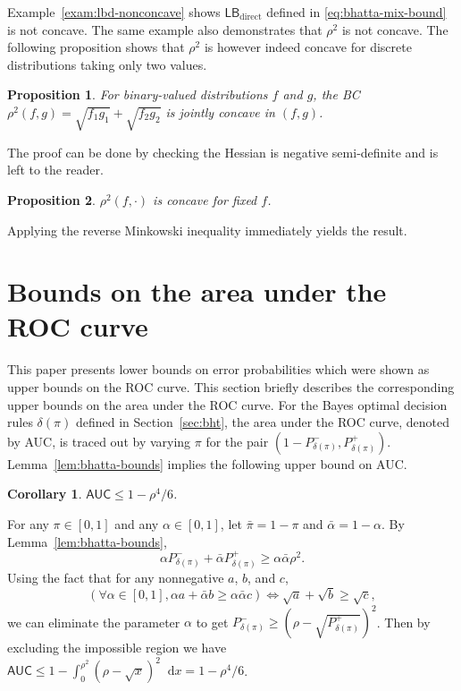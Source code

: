 \documentclass[conference,letterpaper]{IEEEtran}
\newtheorem{prop}{Proposition}
\newtheorem{cor}{Corollary}
\renewcommand{\d}{\mathop{}\!\mathrm{d}}%
\newcommand{\distA}{f}%
\newcommand{\distB}{g}%
\newcommand{\fnrHT}{P^-}%
\newcommand{\fprHT}{P^+}%
\newcommand{\LBDirect}{\mathsf{LB}_{\text{direct}}}%
\newcommand{\piComp}{\bar\pi}
\newcommand{\alphaComp}{\bar\alpha}
\begin{document}
{Example~\ref{exam:lbd-nonconcave} shows $\LBDirect$ defined in
\eqref{eq:bhatta-mix-bound} is not concave.  The same example also
demonstrates that $\rho^2$ is not concave.  The following proposition
shows that $\rho^2$ is however indeed concave for discrete
distributions taking only two values.

\begin{prop}
  \label{prop:concave-special}
  For binary-valued distributions $\distA$ and $\distB$, the BC
  $\rho^2(\distA, \distB) = \sqrt{\distA_1\distB_1} +
  \sqrt{\distA_2\distB_2}$ is jointly concave in $(\distA, \distB)$.
\end{prop}
The proof can be done by checking the Hessian is negative
semi-definite and is left to the reader.

\begin{prop}
  \label{prop:single}
  $\rho^2(\distA, \cdot)$ is concave for fixed $\distA$.
\end{prop}
\begin{IEEEproof}
  Applying the reverse Minkowski inequality immediately yields the
  result.
\end{IEEEproof}

\section{Bounds on the area under the ROC curve}

This paper presents lower bounds on error probabilities which were
shown as upper bounds on the ROC curve.  This section briefly
describes the corresponding upper bounds on the area under the ROC
curve.  For the Bayes optimal decision rules $\delta(\pi)$ defined in
Section~\ref{sec:bht}, the area under the ROC curve, denoted by AUC,
is traced out by varying $\pi$ for the pair
$(1 - \fnrHT_{\delta(\pi)}, \fprHT_{\delta(\pi)})$.
Lemma~\ref{lem:bhatta-bounds} implies the following upper bound on
AUC.
\begin{cor}
  \label{cor:auc}
  $\mathsf{AUC} \le 1 - \rho^4/6$.
\end{cor}
\begin{IEEEproof}
  For any $\pi\in[0, 1]$ and any $\alpha\in[0, 1]$, let
  $\piComp = 1 - \pi$ and $\alphaComp = 1 - \alpha$.  By
  Lemma~\ref{lem:bhatta-bounds},
  \[\alpha\fnrHT_{\delta(\pi)} + \alphaComp\fprHT_{\delta(\pi)} \ge
    \alpha\alphaComp\rho^2.\]
  Using the fact that for any nonnegative $a$, $b$, and $c$,
  \[(\forall \alpha\in[0, 1], \alpha a + \alphaComp b \ge
    \alpha\alphaComp c) \iff \sqrt a + \sqrt b \ge \sqrt c,\]
  we can eliminate the parameter $\alpha$ to get
  $\fnrHT_{\delta(\pi)} \ge \left(\rho -
    \sqrt{\fprHT_{\delta(\pi)}}\right)^2$.  Then by excluding the
  impossible region we have
  $\mathsf{AUC} \le 1 - \int_0^{\rho^2}(\rho - \sqrt x)^2\d x = 1 -
  \rho^4 / 6$.
\end{IEEEproof}

}
\end{document}
